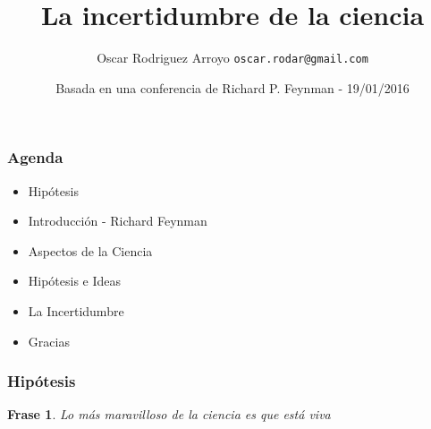 \documentclass{beamer}
\title{La incertidumbre de la ciencia}
\author{Oscar Rodriguez Arroyo 
	      \texttt{oscar.rodar@gmail.com}} %
\date{Basada en una conferencia de Richard P. Feynman - 19/01/2016}
\newtheorem{frase}{Frase}
\begin{document}
\begin{frame}

  \titlepage %
  
\end{frame}


\begin{frame}
  \frametitle{Agenda}

  \begin{itemize}
    \item Hipótesis
    \item Introducción - Richard Feynman  
    \item Aspectos de la Ciencia
    \item Hipótesis e Ideas
    \item La Incertidumbre 
    \item Gracias  
    
  \end{itemize}
 
\end{frame}


\begin{frame}
    \frametitle{Hipótesis}
    \begin{frase}
        Lo más maravilloso de la ciencia es que está viva
    \end{frase}
    
\end{frame}

\end{document}
